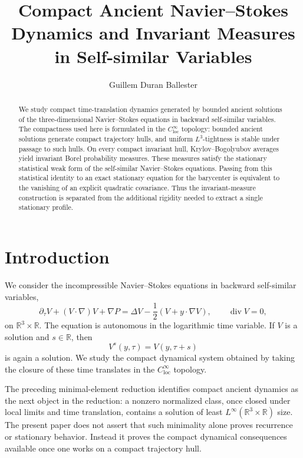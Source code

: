 \documentclass[11pt]{amsart}
\title[Compact ancient dynamics]{Compact Ancient Navier--Stokes Dynamics and Invariant Measures in Self-similar Variables}
\author{Guillem Duran Ballester}
\date{}
\theoremstyle{plain}
\theoremstyle{definition}
\theoremstyle{remark}
\numberwithin{equation}{section}
\begin{document}
\begin{abstract}
We study compact time-translation dynamics generated by bounded ancient
solutions of the three-dimensional Navier--Stokes equations in backward
self-similar variables.  The compactness used here is formulated in the
\(C^\infty_{\mathrm{loc}}\) topology: bounded ancient solutions generate
compact trajectory hulls, and uniform \(L^3\)-tightness is stable under
passage to such hulls.  On every compact invariant hull,
Krylov--Bogolyubov averages yield invariant Borel probability measures.  These
measures satisfy the stationary statistical weak form of the self-similar
Navier--Stokes equations.  Passing from this statistical identity to an exact
stationary equation for the barycenter is equivalent to the vanishing of an
explicit quadratic covariance.  Thus the invariant-measure construction is
separated from the additional rigidity needed to extract a single stationary
profile.
\end{abstract}

\maketitle

\section{Introduction}

We consider the incompressible Navier--Stokes equations in backward
self-similar variables,
\begin{equation}\label{eq:centered}
   \partial_\tau V+(V\cdot\nabla)V+\nabla P
   =
   \Delta V-\frac12(V+y\cdot\nabla V),
   \qquad \operatorname{div}V=0,
\end{equation}
on \(\mathbb R^3\times\mathbb R\).  The equation is autonomous in the
logarithmic time variable.  If \(V\) is a solution and \(s\in\mathbb R\), then
\[
   V^s(y,\tau)=V(y,\tau+s)
\]
is again a solution.  We study the compact dynamical system obtained by taking
the closure of these time translates in the \(C^\infty_{\mathrm{loc}}\)
topology.

The preceding minimal-element reduction identifies compact ancient dynamics as
the next object in the reduction: a nonzero normalized class, once closed under
local limits and time translation, contains a solution of least
\(L^\infty(\mathbb R^3\times\mathbb R)\) size.  The present paper does not
assert that such minimality alone proves recurrence or stationary behavior.
Instead it proves the compact dynamical consequences available once
one works on a compact trajectory hull.
\end{document}
